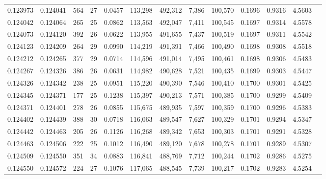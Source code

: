 \begin{tabular}{rrrrrrrrrrrrr}
0.123973 & 0.124041 &   564 &  27 &                                     0.0457 & 113,298 & 492,312 &   7,386 & 100,570 & 0.1696 & 0.9316 & 4.5603 \\
0.124042 & 0.124064 &   265 &  25 &                                     0.0862 & 113,563 & 492,047 &   7,411 & 100,545 & 0.1697 & 0.9314 & 4.5578 \\
0.124073 & 0.124120 &   392 &  26 &                                     0.0622 & 113,955 & 491,655 &   7,437 & 100,519 & 0.1697 & 0.9311 & 4.5542 \\
0.124123 & 0.124209 &   264 &  29 &                                     0.0990 & 114,219 & 491,391 &   7,466 & 100,490 & 0.1698 & 0.9308 & 4.5518 \\
0.124212 & 0.124265 &   377 &  29 &                                     0.0714 & 114,596 & 491,014 &   7,495 & 100,461 & 0.1698 & 0.9306 & 4.5483 \\
0.124267 & 0.124326 &   386 &  26 &                                     0.0631 & 114,982 & 490,628 &   7,521 & 100,435 & 0.1699 & 0.9303 & 4.5447 \\
0.124326 & 0.124342 &   238 &  25 &                                     0.0951 & 115,220 & 490,390 &   7,546 & 100,410 & 0.1700 & 0.9301 & 4.5425 \\
0.124345 & 0.124371 &   177 &  25 &                                     0.1238 & 115,397 & 490,213 &   7,571 & 100,385 & 0.1700 & 0.9299 & 4.5409 \\
0.124371 & 0.124401 &   278 &  26 &                                     0.0855 & 115,675 & 489,935 &   7,597 & 100,359 & 0.1700 & 0.9296 & 4.5383 \\
0.124402 & 0.124439 &   388 &  30 &                                     0.0718 & 116,063 & 489,547 &   7,627 & 100,329 & 0.1701 & 0.9294 & 4.5347 \\
0.124442 & 0.124463 &   205 &  26 &                                     0.1126 & 116,268 & 489,342 &   7,653 & 100,303 & 0.1701 & 0.9291 & 4.5328 \\
0.124463 & 0.124506 &   222 &  25 &                                     0.1012 & 116,490 & 489,120 &   7,678 & 100,278 & 0.1701 & 0.9289 & 4.5307 \\
0.124509 & 0.124550 &   351 &  34 &                                     0.0883 & 116,841 & 488,769 &   7,712 & 100,244 & 0.1702 & 0.9286 & 4.5275 \\
0.124550 & 0.124572 &   224 &  27 &                                     0.1076 & 117,065 & 488,545 &   7,739 & 100,217 & 0.1702 & 0.9283 & 4.5254 \\

\end{tabular}
